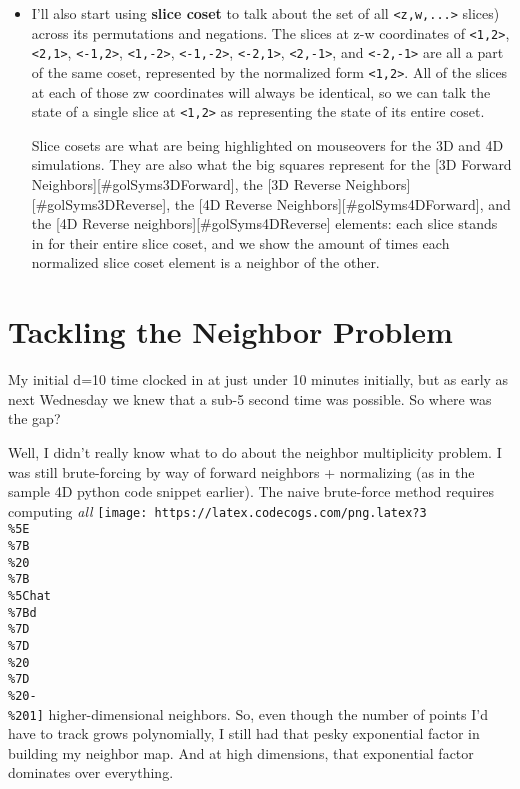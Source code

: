 \documentclass[]{article}
\begin{document}
\begin{itemize}
\item
  I'll also start using \textbf{slice coset} to talk about the set of all
  \texttt{\textless{}z,w,...\textgreater{}} slices) across its permutations and
  negations. The slices at z-w coordinates of
  \texttt{\textless{}1,2\textgreater{}}, \texttt{\textless{}2,1\textgreater{}},
  \texttt{\textless{}-1,2\textgreater{}},
  \texttt{\textless{}1,-2\textgreater{}},
  \texttt{\textless{}-1,-2\textgreater{}},
  \texttt{\textless{}-2,1\textgreater{}},
  \texttt{\textless{}2,-1\textgreater{}}, and
  \texttt{\textless{}-2,-1\textgreater{}} are all a part of the same coset,
  represented by the normalized form \texttt{\textless{}1,2\textgreater{}}. All
  of the slices at each of those zw coordinates will always be identical, so we
  can talk the state of a single slice at \texttt{\textless{}1,2\textgreater{}}
  as representing the state of its entire coset.

  Slice cosets are what are being highlighted on mouseovers for the 3D and 4D
  simulations. They are also what the big squares represent for the {[}3D
  Forward Neighbors{]}{[}\#golSyms3DForward{]}, the {[}3D Reverse
  Neighbors{]}{[}\#golSyms3DReverse{]}, the {[}4D Reverse
  Neighbors{]}{[}\#golSyms4DForward{]}, and the {[}4D Reverse
  neighbors{]}{[}\#golSyms4DReverse{]} elements: each slice stands in for their
  entire slice coset, and we show the amount of times each normalized slice
  coset element is a neighbor of the other.
\end{itemize}

\hypertarget{tackling-the-neighbor-problem}{%
\section{Tackling the Neighbor Problem}\label{tackling-the-neighbor-problem}}

My initial d=10 time clocked in at just under 10 minutes initially, but as early
as next Wednesday we knew that a sub-5 second time was possible. So where was
the gap?

Well, I didn't really know what to do about the neighbor multiplicity problem. I
was still brute-forcing by way of forward neighbors + normalizing (as in the
sample 4D python code snippet earlier). The naive brute-force method requires
computing \emph{all}
\texttt{[image: https://latex.codecogs.com/png.latex?3\\\%5E\\\%7B\\\%20\\\%7B\\\%5Chat\\\%7Bd\\\%7D\\\%7D\\\%20\\\%7D\\\%20-\\\%201]}
higher-dimensional neighbors. So, even though the number of points I'd have to
track grows polynomially, I still had that pesky exponential factor in building
my neighbor map. And at high dimensions, that exponential factor dominates over
everything.
\end{document}
